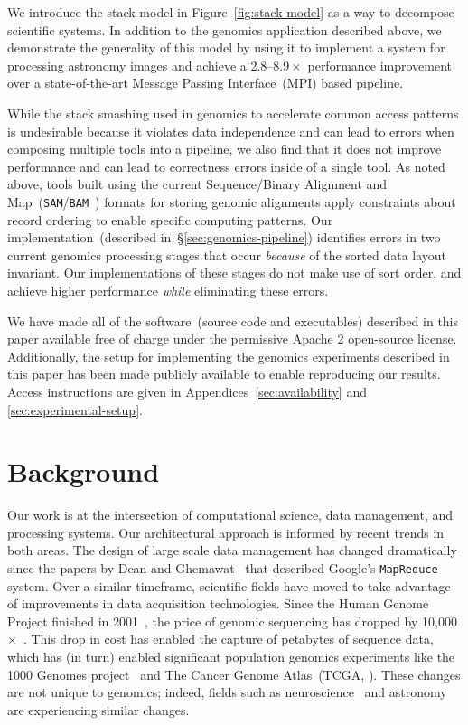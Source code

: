 \documentclass{acm_proc_article-sp}
\begin{document}
We introduce the stack model in Figure~\ref{fig:stack-model} as a way to decompose scientific systems. In
addition to the genomics application described above, we demonstrate the generality of this model by using it to
implement a system for processing astronomy images and achieve a 2.8--$8.9\times$ performance
improvement over a state-of-the-art Message Passing Interface~(MPI) based pipeline.

While the stack smashing used in genomics to accelerate common access patterns is undesirable because it
violates data independence and can lead to errors when composing multiple tools into a pipeline, we also find
that it does not improve performance and can lead to correctness errors inside of a single tool. As noted
above, tools built using the current Sequence/Binary Alignment and Map~(\texttt{SAM}/\texttt{BAM}~\cite{li09}) formats
for storing genomic alignments apply constraints about record ordering to enable specific computing patterns. Our
implementation~(described in~\S\ref{sec:genomics-pipeline}) identifies errors in two current genomics
processing stages that occur \emph{because} of the sorted data layout invariant. Our implementations of
these stages do not make use of sort order, and achieve higher performance \emph{while} eliminating
these errors.

We have made all of the software~(source code and executables) described in this paper available free
of charge under the permissive Apache 2 open-source license. Additionally, the setup for implementing the
genomics experiments described in this paper has been made publicly available to enable reproducing our
results. Access instructions are given in Appendices~\ref{sec:availability} and \ref{sec:experimental-setup}.

\section{Background}
\label{sec:background}

Our work is at the intersection of computational science, data management, and processing
systems. Our architectural approach is informed by recent trends in both areas. The design of
large scale data management has changed dramatically since the papers by Dean and
Ghemawat~\cite{dean04, dean08} that described Google's \texttt{MapReduce} system. Over a
similar timeframe, scientific fields have moved to take advantage of improvements in data acquisition
technologies. Since the Human Genome Project finished in 2001~\cite{lander01}, the price
of genomic sequencing has dropped by 10,000$\times$~\cite{nhgri}. This drop in cost has enabled the
capture of petabytes of sequence data, which has (in turn) enabled significant population genomics
experiments like the 1000 Genomes project~\cite{siva08} and The Cancer Genome Atlas~(TCGA,
\cite{weinstein13}). These changes are not unique to genomics; indeed, fields such as
neuroscience~\cite{cunningham14} and astronomy~\cite{lsst2008, turk11, sdss2000} are experiencing similar
changes.
\end{document}
